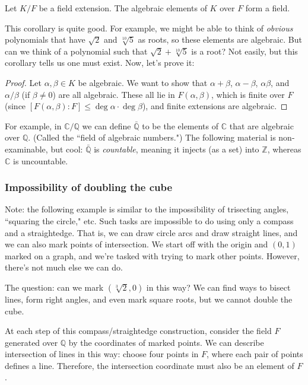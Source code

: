 \documentclass{article}
\theoremstyle{plain}
\newcommand{\Q}{\mathbb{Q}}
\newcommand{\C}{\mathbb{C}}
\newcommand{\Z}{\mathbb{Z}}
\newcommand{\on}[1]{\operatorname{#1}}
\begin{document}
\begin{corollary}{}{}
	Let $K/F$ be a field extension. The algebraic elements of $K$ over $F$ form a field.
\end{corollary}
This corollary is quite good. For example, we might be able to think of \textit{obvious} polynomials that have $\sqrt{2}$ and $\sqrt[10]{5}$ as roots, so these elements are algebraic. But can we think of a polynomial such that $\sqrt{2} + \sqrt[10]{5}$ is a root? Not easily, but this corollary tells us one must exist. Now, let's prove it:
\begin{proof}
	Let $\alpha, \beta \in K$ be algebraic. We want to show that $\alpha + \beta$, $\alpha - \beta$, $\alpha\beta$, and $\alpha/\beta$ (if $\beta \ne 0$) are all algebraic. These all lie in $F(\alpha,\beta)$, which is finite over $F$ (since $[F(\alpha,\beta) : F] \le \on{deg}\alpha\cdot\on{deg}\beta$), and finite extensions are algebraic.
\end{proof}
For example, in $\C/\Q$ we can define $\bar{\Q}$ to be the elements of $\C$ that are algebraic over $\Q$. (Called the ``field of algebraic numbers.") The following material is non-examinable, but cool: $\bar{\Q}$ is \textit{countable}, meaning it injects (as a set) into $\Z$, whereas $\C$ is uncountable.

\subsubsection{Impossibility of doubling the cube}
Note: the following example is similar to the impossibility of trisecting angles, ``squaring the circle," etc. Such tasks are impossible to do using only a compass and a straightedge. That is, we can draw circle arcs and draw straight lines, and we can also mark points of intersection. We start off with the origin and $(0,1)$ marked on a graph, and we're tasked with trying to mark other points. However, there's not much else we can do. \frownie

The question: can we mark $(\sqrt[3]{2},0)$ in this way? We can find ways to bisect lines, form right angles, and even mark square roots, but we cannot double the cube.

At each step of this compass/straightedge construction, consider the field $F$ generated over $\Q$ by the coordinates of marked points. We can describe intersection of lines in this way: choose four points in $F$, where each pair of points defines a line. Therefore, the intersection coordinate must also be an element of $F$.
\end{document}
